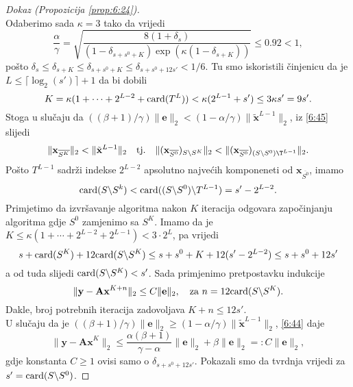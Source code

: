 \documentclass[a4paper,twoside,12pt]{memoir} %
\newcommand{\vect}[1]{\mathbf{#1}}
\renewcommand{\vec}{\vect}
\newcommand{\card}{\text{\normalfont{card}}}
\newcommand{\norm}[1]{\|{#1}\|}
\begin{document}
\begin{proof}[Dokaz (Propozicija \ref{prop:6:24})]
\begin{equation}
    \end{equation}
    Odaberimo sada $\kappa = 3$ tako da vrijedi
    \begin{equation*}
        \frac{\alpha}{\gamma} = \sqrt{\frac{8(1+\delta_s)}{(1-\delta_{s+s^0+K}) \exp(\kappa(1-\delta_{s+K}))}}  \leq 0.92 < 1,
    \end{equation*}
    po\v{s}to $\delta_s \leq \delta_{s+K} \leq \delta_{s+s^0+K} \leq \delta_{s+s^0+12s'} < 1/6$. Tu smo iskoristili \v{c}injenicu da je $L \leq \lceil \log_2(s') \rceil + 1$ da bi dobili
    \begin{equation*}
        K = \kappa(1+\cdots+2^{L-2} + \card(T^L)) < \kappa(2^{L-1}+s')\leq 3 \kappa s' = 9 s'.
    \end{equation*}
    Stoga u slu\v{c}aju da $((\beta+1)/\gamma)\norm{\vec e}_2 < (1- \alpha/\gamma) \norm{\tilde{\vec x}^{L-1}}_2$, iz \eqref{6:45} slijedi
    \begin{equation*}
        \norm{\vec x_{\overline{S^K}}}_2 < \norm{\tilde{\vec x}^{L-1}}_2 \quad \text{tj.} \quad \norm{(\vec x_{\overline{S^0}})_{S \backslash S^K}}_2 < \norm{(\vec x_{\overline{S^0}})_{(S \backslash S^0)\T^{L-1}}}_2.
    \end{equation*}
    Po\v{s}to $T^{L-1}$ sadr\v{z}i indekse $2^{L-2}$ apsolutno najve\'cih komponeneti od $\vec x_{\overline{S^0}}$, imamo
    \begin{equation*}
    \card(S \backslash S^k)< \card((S \backslash S^0) \backslash T^{L-1}) = s' - 2^{L-2}.
    \end{equation*}
    Primjetimo da izvr\v{s}avanje algoritma nakon $K$ iteracija odgovara zapo\v{c}injanju algoritma gdje $S^0$ zamjenimo sa $S^K$. Imamo da je $K \leq \kappa (1+\cdots+2^{L-2}+2^{L-1}) < 3 \cdot 2^L$, pa vrijedi
    \begin{equation*}
        s + \card(S^K)+12 \card(S \backslash S^K) \leq s + s^0 + K + 12(s' - 2^{L-2}) \leq s+ s^0 + 12s'
    \end{equation*}
    a od tuda slijedi $\card(S \backslash S^K) < s'$. Sada primjenimo pretpostavku indukcije
    \begin{equation*}
        \norm{\vec y - \vec{Ax}^{K+n}}_2 \leq C \norm{\vec e}_2, \quad \text{za } n=12\card(S \backslash S^K).
    \end{equation*}
    Dakle, broj potrebnih iteracija zadovoljava $K+n \leq 12s'$.\\
    U slu\v{c}aju da je $((\beta + 1)/\gamma)\norm{\vec e}_2 \geq (1-\alpha/\gamma)\norm{\tilde{\vec x}^{L-1}}_2$, \eqref{6:44} daje
    \begin{equation*}
        \norm{\vec y - \vec{Ax}^K}_2 \leq \frac{\alpha(\beta+1)}{\gamma - \alpha} \norm{\vec e}_2 + \beta \norm{\vec e}_2 =: C \norm{\vec e}_2,
    \end{equation*}
    gdje konstanta $C \geq 1$ ovisi samo o $\delta_{s+s^0+12s'}$. Pokazali smo da tvrdnja vrijedi za $s' = \card(S \backslash S^0)$.
\end{proof}
\end{document}

